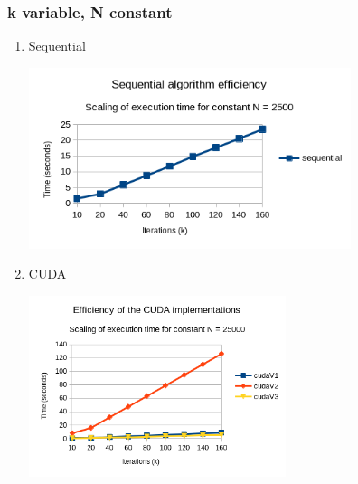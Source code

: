 \documentclass[11pt]{article}
\begin{document}
\subsubsection{k variable, N constant}
\label{sec:org03cb69e}
\begin{enumerate}
\item Sequential
\label{sec:orge02e668}
\begin{center}
\includegraphics[height=200]{./images/seq-efficiency.png}
\end{center}
\pagebreak
\item CUDA
\label{sec:org932a6b2}
\begin{center}
\includegraphics[height=200]{./images/cuda-efficiency.png}
\end{center}
\end{enumerate}
\end{document}
